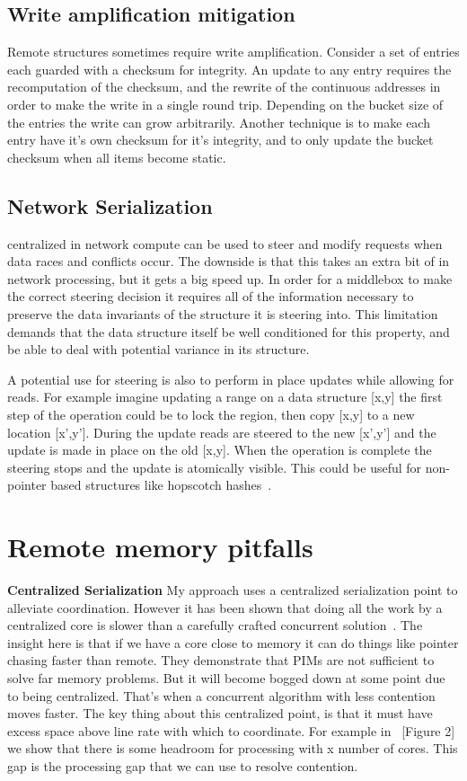 \subsection{Write amplification mitigation}
\label{sec:write-amplification}
Remote structures sometimes require write
amplification. Consider a set of entries each guarded with a checksum for
integrity. An update to any entry requires the recomputation of the checksum,
and the rewrite of the continuous addresses in order to make the write in a
single round trip. Depending on the bucket size of the entries the write can
grow arbitrarily. Another technique is to make each entry have it's own checksum
for it's integrity, and to only update the bucket checksum when all items become
static.

\subsection{Network Serialization} 
\label{sec:net_ser}
%
centralized in network compute can be used to steer and modify
requests when data races and conflicts occur. The downside is that this takes an
extra bit of in network processing, but it gets a big speed up. In order for a
middlebox to make the correct steering decision it requires all of the
information necessary to preserve the data invariants of the structure it is
steering into. This limitation demands that the data structure itself be well
conditioned for this property, and be able to deal with potential variance in
its structure.

A potential use for steering is also to perform in place updates while allowing
for reads. For example imagine updating a range on a data structure [x,y] the
first step of the operation could be to lock the region, then copy [x,y] to a
new location [x',y']. During the update reads are steered to the new [x',y'] and
the update is made in place on the old [x,y]. When the operation is complete the
steering stops and the update is atomically visible. This could be useful for
non-pointer based structures like hopscotch hashes~\cite{hopscotch}.

\section{Remote memory pitfalls}
\label{sec:pitfalls}

\textbf{Centralized Serialization} My approach uses a centralized serialization
point to alleviate coordination. However it has been shown that doing all the
work by a centralized core is slower than a carefully crafted concurrent
solution~\cite{near-memory-structs}. The insight here is that if we have a core
close to memory it can do things like pointer chasing faster than remote. They
demonstrate that PIMs are not sufficient to solve far memory problems. But it
will become bogged down at some point due to being centralized. That's when a
concurrent algorithm with less contention moves faster. The key thing about this
centralized point, is that it must have excess space above line rate with which
to coordinate. For example in ~\cite{fairnic}[Figure 2] we show that there is
some headroom for processing with x number of cores. This gap is the processing
gap that we can use to resolve contention.

